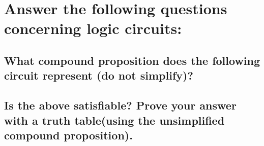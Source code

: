 \documentclass{article}
\begin{document}
    \subsection{} 
    \subsection{} 
\section{Answer the following questions concerning logic circuits:}
    \subsection{What compound proposition does the following circuit represent (do not simplify)?} 
    \subsection{Is the above satisfiable? Prove your answer with a truth table(using the unsimplified compound proposition).} 
\end{document}
